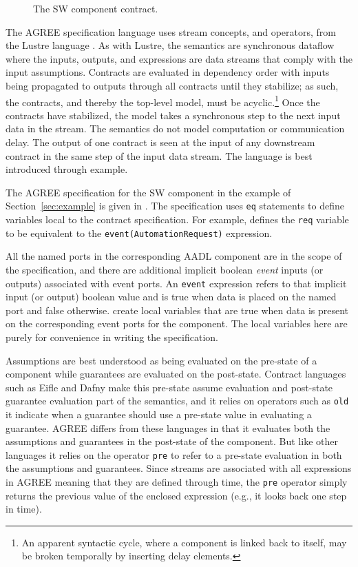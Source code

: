 \begin{figure}
  \begin{center}
    \scalebox{0.62}{\usebox{\sw}}
  \end{center}
  \caption{The SW component contract.}
  \label{fig:sw}
\end{figure}

The AGREE specification language uses stream concepts, and operators, from the Lustre language \cite{10.1145/41625.41641}.
As with Lustre, the semantics are synchronous dataflow where the inputs, outputs, and expressions are data streams that comply with the input assumptions.
Contracts are evaluated in dependency order with inputs being propagated to outputs through all contracts until they stabilize; as such, the contracts, and thereby the top-level model, must be acyclic.\footnote{An apparent syntactic cycle, where a component is linked back to itself, may be broken temporally by inserting delay elements.}
Once the contracts have stabilized, the model takes a synchronous step to the next input data in the stream.
The semantics do not model computation or communication delay.
The output of one contract is seen at the input of any downstream contract in the same step of the input data stream.
The language is best introduced through example.

The AGREE specification for the SW component in the example of Section~\ref{sec:example} is given in .
The specification uses \texttt{eq} statements to define variables local to the contract specification.
For example,  defines the \texttt{req} variable to be equivalent to the \texttt{event(AutomationRequest)} expression.

All the named ports in the corresponding AADL component are in the scope of the specification, and there are additional implicit boolean \emph{event} inputs (or outputs) associated with event ports.
An \texttt{event} expression refers to that implicit input (or output) boolean value and is true when data is placed on the named port and false otherwise.
 create local variables that are true when data is present on the corresponding event ports for the component.
The local variables here are purely for convenience in writing the specification.

Assumptions are best understood as being evaluated on the pre-state of a component while guarantees are evaluated on the post-state.
Contract languages such as Eifle and Dafny make this pre-state assume evaluation and post-state guarantee evaluation part of the semantics, and it relies on operators such as \texttt{old} it indicate when a guarantee should use a pre-state value in evaluating a guarantee.
AGREE differs from these languages in that it evaluates both the assumptions and guarantees in the post-state of the component.
But like other languages it relies on the operator \texttt{pre} to refer to a pre-state evaluation in both the assumptions and guarantees.
Since streams are associated with all expressions in AGREE meaning that they are defined through time, the \texttt{pre} operator simply returns the previous value of the enclosed expression (e.g., it looks back one step in time).


